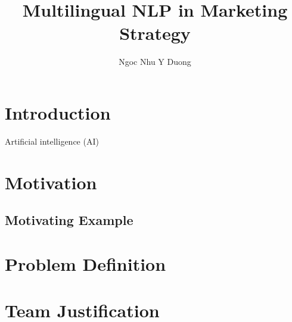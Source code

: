 \documentclass[sigconf]{acmart}
\begin{document}
\title{Multilingual NLP in Marketing Strategy}
\author{Ngoc Nhu Y Duong}

\begin{abstract}

\end{abstract}

\maketitle

\section{Introduction}
Artificial intelligence (AI)

\section{Motivation}

\subsection{Motivating Example}

\section{Problem Definition}

\section{Team Justification} 
\end{document}
